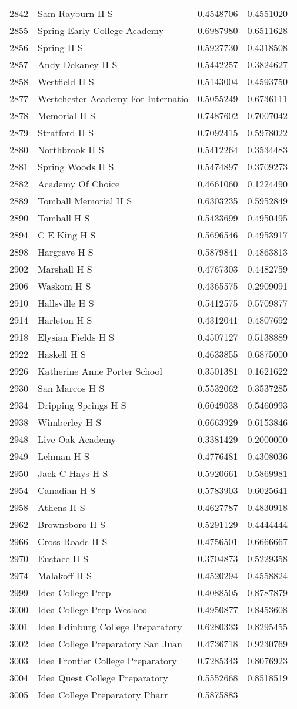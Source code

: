 \documentclass[
]{article}
\begin{document}
\begin{longtable}[]{@{}llrr@{}}
2842 & Sam Rayburn H S & 0.4548706 & 0.4551020\tabularnewline
2855 & Spring Early College Academy & 0.6987980 &
0.6511628\tabularnewline
2856 & Spring H S & 0.5927730 & 0.4318508\tabularnewline
2857 & Andy Dekaney H S & 0.5442257 & 0.3824627\tabularnewline
2858 & Westfield H S & 0.5143004 & 0.4593750\tabularnewline
2877 & Westchester Academy For Internatio & 0.5055249 &
0.6736111\tabularnewline
2878 & Memorial H S & 0.7487602 & 0.7007042\tabularnewline
2879 & Stratford H S & 0.7092415 & 0.5978022\tabularnewline
2880 & Northbrook H S & 0.5412264 & 0.3534483\tabularnewline
2881 & Spring Woods H S & 0.5474897 & 0.3709273\tabularnewline
2882 & Academy Of Choice & 0.4661060 & 0.1224490\tabularnewline
2889 & Tomball Memorial H S & 0.6303235 & 0.5952849\tabularnewline
2890 & Tomball H S & 0.5433699 & 0.4950495\tabularnewline
2894 & C E King H S & 0.5696546 & 0.4953917\tabularnewline
2898 & Hargrave H S & 0.5879841 & 0.4863813\tabularnewline
2902 & Marshall H S & 0.4767303 & 0.4482759\tabularnewline
2906 & Waskom H S & 0.4365575 & 0.2909091\tabularnewline
2910 & Hallsville H S & 0.5412575 & 0.5709877\tabularnewline
2914 & Harleton H S & 0.4312041 & 0.4807692\tabularnewline
2918 & Elysian Fields H S & 0.4507127 & 0.5138889\tabularnewline
2922 & Haskell H S & 0.4633855 & 0.6875000\tabularnewline
2926 & Katherine Anne Porter School & 0.3501381 &
0.1621622\tabularnewline
2930 & San Marcos H S & 0.5532062 & 0.3537285\tabularnewline
2934 & Dripping Springs H S & 0.6049038 & 0.5460993\tabularnewline
2938 & Wimberley H S & 0.6663929 & 0.6153846\tabularnewline
2948 & Live Oak Academy & 0.3381429 & 0.2000000\tabularnewline
2949 & Lehman H S & 0.4776481 & 0.4308036\tabularnewline
2950 & Jack C Hays H S & 0.5920661 & 0.5869981\tabularnewline
2954 & Canadian H S & 0.5783903 & 0.6025641\tabularnewline
2958 & Athens H S & 0.4627787 & 0.4830918\tabularnewline
2962 & Brownsboro H S & 0.5291129 & 0.4444444\tabularnewline
2966 & Cross Roads H S & 0.4756501 & 0.6666667\tabularnewline
2970 & Eustace H S & 0.3704873 & 0.5229358\tabularnewline
2974 & Malakoff H S & 0.4520294 & 0.4558824\tabularnewline
2999 & Idea College Prep & 0.4088505 & 0.8787879\tabularnewline
3000 & Idea College Prep Weslaco & 0.4950877 & 0.8453608\tabularnewline
3001 & Idea Edinburg College Preparatory & 0.6280333 &
0.8295455\tabularnewline
3002 & Idea College Preparatory San Juan & 0.4736718 &
0.9230769\tabularnewline
3003 & Idea Frontier College Preparatory & 0.7285343 &
0.8076923\tabularnewline
3004 & Idea Quest College Preparatory & 0.5552668 &
0.8518519\tabularnewline
3005 & Idea College Preparatory Pharr & 0.5875883 &

\end{longtable}
\end{document}
